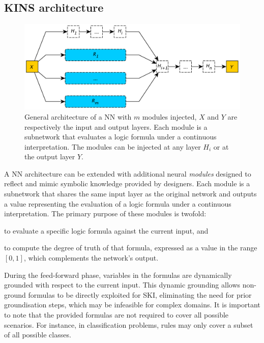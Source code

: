 \subsection{KINS architecture}\label{subsec:kins-architecture}
%
\begin{figure}
    \centering
    \includegraphics[width=\textwidth]{figures/kins-network-architecture}
    \caption[General architecture of a NN with KINS modules]{
        General architecture of a \gls{NN} with $m$ modules injected, $X$ and $Y$ are respectively the input and output layers.
        Each module is a subnetwork that evaluates a logic formula under a continuous interpretation.
        The modules can be injected at any layer $H_i$ or at the output layer $Y$.
    }
    \label{fig:kins-network-architecture}
\end{figure}
%
A \gls{NN} architecture can be extended with additional neural \emph{modules} designed to reflect and mimic symbolic knowledge provided by designers.
%
Each module is a subnetwork that shares the same input layer as the original network and outputs a value representing the evaluation of a logic formula under a continuous interpretation.
%
The primary purpose of these modules is twofold:
\begin{inlinelist}
    \item to evaluate a specific logic formula against the current input, and
    \item to compute the degree of truth of that formula, expressed as a value in the range \([0, 1]\), which complements the network's output.
\end{inlinelist}
%
During the feed-forward phase, variables in the formulas are dynamically grounded with respect to the current input.
%
This dynamic grounding allows non-ground formulas to be directly exploited for \gls{SKI}, eliminating the need for prior groundisation steps, which may be infeasible for complex domains.
%
It is important to note that the provided formulas are not required to cover all possible scenarios.
%
For instance, in classification problems, rules may only cover a subset of all possible classes.


